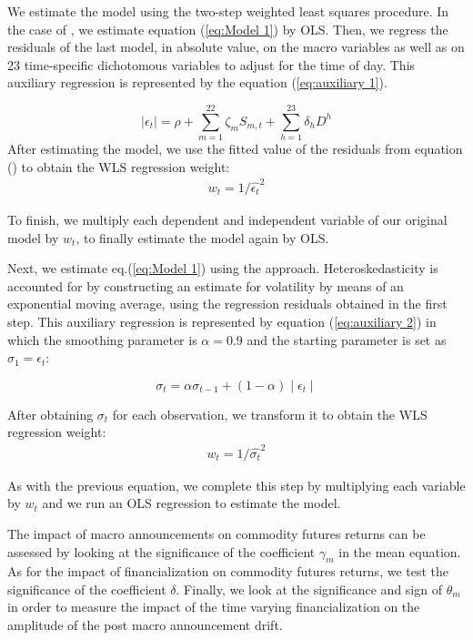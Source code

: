 \documentclass[12pt]{article}
\begin{document}
We estimate the model using the two-step weighted least squares procedure. In the case of \citet{andersen2007real}, we estimate equation (\ref{eq:Model 1}) by OLS. Then, we regress the residuals of the last model, in absolute value, on the macro variables as well as on 23 time-specific dichotomous variables to adjust for the time of day. This auxiliary regression is represented by the equation (\ref{eq:auxiliary 1}).

\begin{equation}\label{eq:auxiliary 1}
\mid \epsilon_{t} \mid=\rho+\sum_{m=1}^{22} \zeta_m S_{m,t}+\sum_{h=1}^{23} \delta_h D^h
\end{equation}
After estimating the model, we use the fitted value of the residuals from equation (\label{eq:auxiliary 1}) to obtain the WLS regression weight:
\begin{align*}
w_t=1/\hat{\epsilon_t}^2
\end{align*}

To finish, we multiply each dependent and independent variable of our original model by $w_t$, to finally estimate the model again by OLS.

Next, we estimate eq.(\ref{eq:Model 1}) using the \citet{kurov2019price} approach. Heteroskedasticity is accounted for by constructing an estimate for volatility by means of an exponential moving average, using the regression residuals obtained in the first step. This auxiliary regression is represented by equation (\ref{eq:auxiliary 2}) in which the smoothing parameter is $\alpha=0.9$ and the starting parameter is set as $\sigma_1=\epsilon_t$:

\begin{equation}\label{eq:auxiliary 2}
\sigma_t=\alpha \sigma_{t-1}+(1-\alpha) \mid \epsilon_t \mid 
\end{equation} 

After obtaining  $\sigma_t$ for each observation, we transform it to obtain the WLS regression weight:
\begin{align*}
w_t=1/\hat{\sigma_t}^2
\end{align*}

As with the previous equation, we complete this step by multiplying each variable by  $w_t$ and we run an OLS regression to estimate the model.%

 The impact of macro announcements on commodity futures returns  can be assessed by looking at the significance of the coefficient $\gamma_m$ in the mean equation. As for the impact of financialization on commodity futures returns, we test the significance of the coefficient $\delta$. Finally, we look at the significance and sign of $\theta_m$ in order to measure the impact of the time varying financialization on the amplitude of the post macro announcement drift.
 
\end{document}
